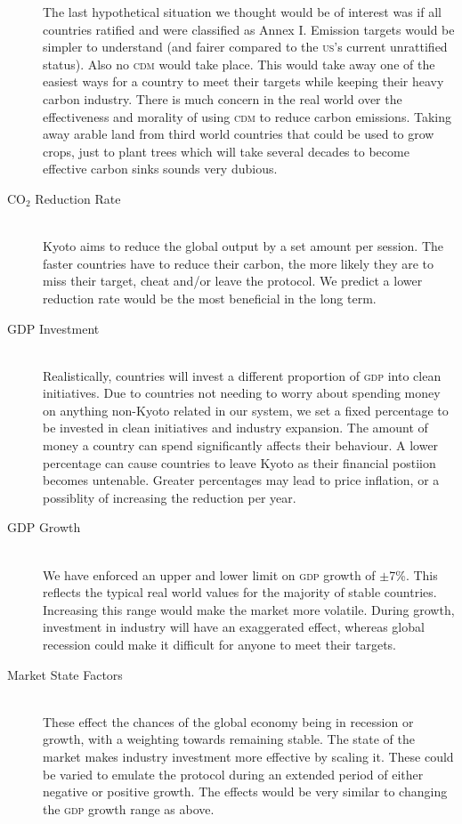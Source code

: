 \begin{description}
The last hypothetical situation we thought would be of interest was if all countries ratified and were classified as Annex I. Emission targets would be simpler to understand (and fairer compared to the \textsc{us}'s current unrattified status). Also no \textsc{cdm} would take place. This would take away one of the easiest ways for a country to meet their targets while keeping their heavy carbon industry. There is much concern in the real world over the effectiveness and morality of using \textsc{cdm} to reduce carbon emissions. Taking away arable land from third world countries that could be used to grow crops, just to plant trees which will take several decades to become effective carbon sinks sounds very dubious.

\item[CO$_2$ Reduction Rate] \hfill \\

Kyoto aims to reduce the global \CO output by a set amount per session. The faster countries have to reduce their carbon, the more likely they are to miss their target, cheat and/or leave the protocol. We predict a lower reduction rate would be the most beneficial in the long term.


\item[GDP Investment] \hfill \\

Realistically, countries will invest a different proportion of \textsc{gdp} into clean initiatives. Due to countries not needing to worry about spending money on anything non-Kyoto related in our system, we set a fixed percentage to be invested in clean initiatives and industry expansion.   The amount of money a country can spend significantly affects their behaviour.  A lower percentage can cause countries to leave Kyoto as their financial postiion becomes untenable.  Greater percentages may lead to price inflation, or a possiblity of increasing the reduction per year.

\item[GDP Growth] \hfill \\

We have enforced an upper and lower limit on \textsc{gdp} growth of $\pm$7\%. This reflects the typical real world values for the majority of stable countries. Increasing this range would make the market more volatile. During growth, investment in industry will have an exaggerated effect, whereas global recession could make it difficult for anyone to meet their targets.

\item[Market State Factors] \hfill \\

These effect the chances of the global economy being in recession or growth, with a weighting towards remaining stable. The state of the market makes industry investment more effective by scaling it.  These could be varied to emulate the protocol during an extended period of either negative or positive growth. The effects would be very similar to changing the \textsc{gdp} growth range as above.
\end{description}

